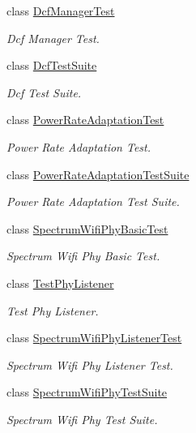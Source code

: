 \begin{DoxyCompactItemize}
class \hyperlink{classDcfManagerTest}{Dcf\+Manager\+Test}
\begin{DoxyCompactList}\small\item\em Dcf Manager Test. \end{DoxyCompactList}\item 
class \hyperlink{classDcfTestSuite}{Dcf\+Test\+Suite}
\begin{DoxyCompactList}\small\item\em Dcf Test Suite. \end{DoxyCompactList}\item 
class \hyperlink{classPowerRateAdaptationTest}{Power\+Rate\+Adaptation\+Test}
\begin{DoxyCompactList}\small\item\em Power Rate Adaptation Test. \end{DoxyCompactList}\item 
class \hyperlink{classPowerRateAdaptationTestSuite}{Power\+Rate\+Adaptation\+Test\+Suite}
\begin{DoxyCompactList}\small\item\em Power Rate Adaptation Test Suite. \end{DoxyCompactList}\item 
class \hyperlink{classSpectrumWifiPhyBasicTest}{Spectrum\+Wifi\+Phy\+Basic\+Test}
\begin{DoxyCompactList}\small\item\em Spectrum Wifi Phy Basic Test. \end{DoxyCompactList}\item 
class \hyperlink{classTestPhyListener}{Test\+Phy\+Listener}
\begin{DoxyCompactList}\small\item\em Test Phy Listener. \end{DoxyCompactList}\item 
class \hyperlink{classSpectrumWifiPhyListenerTest}{Spectrum\+Wifi\+Phy\+Listener\+Test}
\begin{DoxyCompactList}\small\item\em Spectrum Wifi Phy Listener Test. \end{DoxyCompactList}\item 
class \hyperlink{classSpectrumWifiPhyTestSuite}{Spectrum\+Wifi\+Phy\+Test\+Suite}
\begin{DoxyCompactList}\small\item\em Spectrum Wifi Phy Test Suite. \end{DoxyCompactList}\item 

\end{DoxyCompactItemize}

